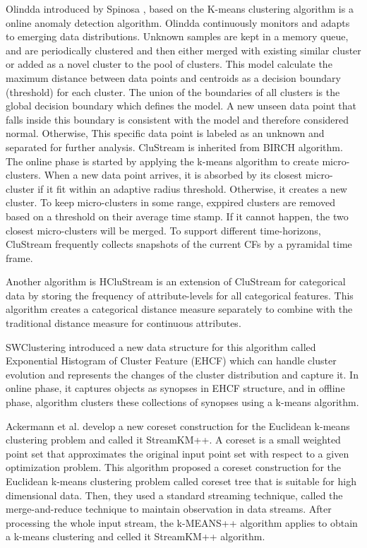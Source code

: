 \documentclass[../UNBThesis2.tex]{subfiles}
\begin{document}
\begin{itemize}
Olindda introduced by Spinosa \cite{spinosa2007olindda}, based on the K-means clustering algorithm is a online anomaly detection algorithm. Olindda continuously monitors and adapts to emerging data distributions. Unknown samples are kept in a memory queue, and are periodically clustered and then either merged with existing similar cluster or added as a novel cluster to the pool of clusters.
This model calculate the maximum distance between data points and centroids as a decision boundary (threshold) for each cluster. The union of the boundaries of all clusters is the global decision boundary which defines the model. A new unseen data point that falls inside this boundary is consistent with the model and therefore considered normal. Otherwise, This specific data point is labeled as an unknown and separated for further analysis.
CluStream \cite{aggarwal2003framework} is inherited from BIRCH algorithm. The online phase is started by applying the k-means algorithm to create micro-clusters. When a new data point arrives, it is absorbed by its closest micro-cluster if it fit within an adaptive radius threshold. Otherwise, it creates a new cluster. To keep micro-clusters in some range, exppired clusters are removed based on a threshold on their average time stamp. If it cannot happen, the two closest micro-clusters will be merged.
To support different time-horizons, CluStream frequently collects snapshots of the current CFs by a pyramidal time frame. 

Another algorithm is HCluStream \cite{yang2006hclustream} is an extension of CluStream for categorical data by storing the frequency of attribute-levels for all categorical features. This algorithm creates a  categorical distance measure separately to combine with the traditional distance measure for continuous attributes.

SWClustering \cite{zhou2008tracking} introduced a new data structure for this algorithm called Exponential Histogram of Cluster Feature (EHCF) which can handle cluster evolution and represents the changes of the cluster distribution and capture it. In online phase, it captures objects as synopses in EHCF structure, and in offline phase, algorithm clusters these collections of synopses using a k-means algorithm.

Ackermann et al. \cite{ackermann2012streamk} develop a new coreset construction for the Euclidean k-means clustering problem and called it StreamKM++. A coreset is a small weighted point set that approximates the original input
point set with respect to a given optimization problem. This algorithm proposed a coreset construction for the Euclidean k-means clustering problem called coreset tree that is suitable for high dimensional data. Then, they used a standard streaming technique, called the merge-and-reduce technique to maintain observation in data streams. After processing the whole input stream, the k-MEANS++ algorithm applies to obtain a k-means clustering and celled it StreamKM++ algorithm.


\end{itemize}
\end{document}
